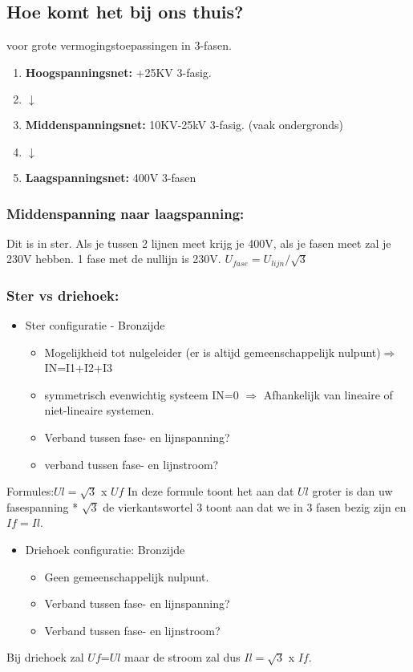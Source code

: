 \documentclass[12pt]{article}
\begin{document}
\subsection{Hoe komt het bij ons thuis?}
voor grote vermogingstoepassingen in 3-fasen.
\begin{enumerate}
    \item \textbf{Hoogspanningsnet:} +25KV 3-fasig.
    \item[] $\downarrow$ 
    \item \textbf{Middenspanningsnet:} 10KV-25kV 3-fasig. (vaak ondergronds)
    \item[] $\downarrow$
    \item \textbf{Laagspanningsnet:} 400V 3-fasen
\end{enumerate}
\subsubsection{Middenspanning naar laagspanning:}
Dit is in ster.
Als je tussen 2 lijnen meet krijg je 400V, als je fasen meet zal je 230V hebben.
1 fase met de nullijn is 230V.
$U_{fase}=U_{lijn}/\sqrt{3}$
\subsubsection{Ster vs driehoek:}
\begin{itemize}
    \item Ster configuratie - Bronzijde\begin{itemize}
        \item Mogelijkheid tot nulgeleider (er is altijd gemeenschappelijk nulpunt)$\Rightarrow$ IN=I1+I2+I3
        \item symmetrisch evenwichtig systeem IN=0 $\Rightarrow$ Afhankelijk van lineaire of niet-lineaire systemen.
        \item Verband tussen fase- en lijnspanning?
        \item verband tussen fase- en lijnstroom?
    \end{itemize}
\end{itemize}
Formules:$Ul=\sqrt{3}$ x $Uf$ In deze formule toont het aan dat $Ul$ groter is dan uw fasespanning * $\sqrt3$ de vierkantswortel 3 toont aan dat we in 3 fasen bezig zijn
en $If=Il$.
\begin{itemize}
    \item Driehoek configuratie: Bronzijde\begin{itemize}
    \item Geen gemeenschappelijk nulpunt.
    \item Verband tussen fase- en lijnspanning?
    \item Verband tussen fase- en lijnstroom?
    \end{itemize}
\end{itemize}
Bij driehoek zal $Uf$=$Ul$ maar de stroom zal dus $Il=\sqrt{3}$ x $If$.
\end{document}
